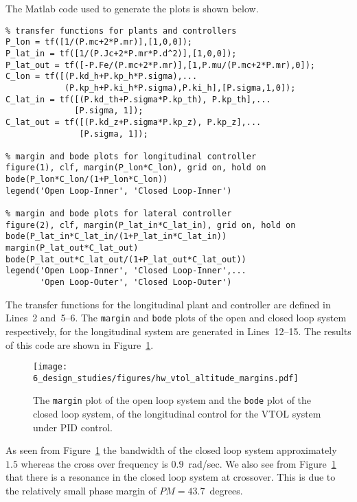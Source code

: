 The Matlab code used to generate the plots is shown below.
\begin{lstlisting}
% transfer functions for plants and controllers
P_lon = tf([1/(P.mc+2*P.mr)],[1,0,0]);
P_lat_in = tf([1/(P.Jc+2*P.mr*P.d^2)],[1,0,0]);
P_lat_out = tf([-P.Fe/(P.mc+2*P.mr)],[1,P.mu/(P.mc+2*P.mr),0]);
C_lon = tf([(P.kd_h+P.kp_h*P.sigma),...
            (P.kp_h+P.ki_h*P.sigma),P.ki_h],[P.sigma,1,0]);
C_lat_in = tf([(P.kd_th+P.sigma*P.kp_th), P.kp_th],...
              [P.sigma, 1]);
C_lat_out = tf([(P.kd_z+P.sigma*P.kp_z), P.kp_z],...
               [P.sigma, 1]);

% margin and bode plots for longitudinal controller 
figure(1), clf, margin(P_lon*C_lon), grid on, hold on
bode(P_lon*C_lon/(1+P_lon*C_lon)) 
legend('Open Loop-Inner', 'Closed Loop-Inner')

% margin and bode plots for lateral controller 
figure(2), clf, margin(P_lat_in*C_lat_in), grid on, hold on
bode(P_lat_in*C_lat_in/(1+P_lat_in*C_lat_in)) 
margin(P_lat_out*C_lat_out)
bode(P_lat_out*C_lat_out/(1+P_lat_out*C_lat_out))
legend('Open Loop-Inner', 'Closed Loop-Inner',...
       'Open Loop-Outer', 'Closed Loop-Outer')
\end{lstlisting}
The transfer functions for the longitudinal plant and controller are defined in Lines~2 and~5--6.  The {\tt margin} and {\tt bode} plots of the open and closed loop system respectively, for the longitudinal system are generated in Lines~12--15.
The results of this code are shown in Figure~\ref{fig:hw_vtol_altitude_margins}.
\begin{figure}[H]
   \centering
   \texttt{[image: 6\_design\_studies/figures/hw\_vtol\_altitude\_margins.pdf]}
   \caption{The {\tt margin} plot of the open loop system and the {\tt bode} plot of the closed loop system, of the longitudinal control for the VTOL system under PID control.}
   \label{fig:hw_vtol_altitude_margins}
\end{figure} 

As seen from Figure~\ref{fig:hw_vtol_altitude_margins} the bandwidth of the closed loop system approximately $1.5$ whereas the cross over frequency is $0.9$~rad/sec.  We also see from  Figure~\ref{fig:hw_vtol_altitude_margins} that there is a resonance in the closed loop system at crossover.  This is due to the relatively small phase margin of $PM=43.7$~degrees. 


